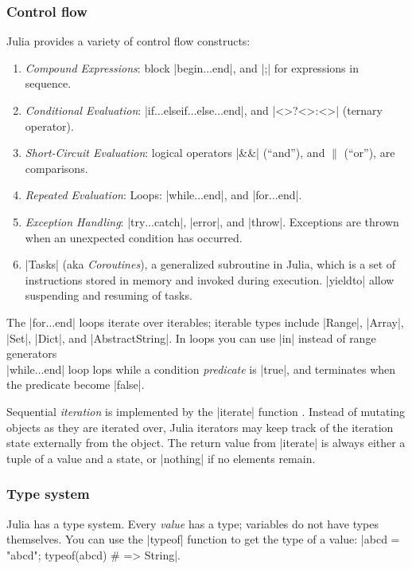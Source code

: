 \subsubsection*{Control flow}

Julia provides a variety of control flow constructs:
\begin{enumerate}
\item 
\emph{Compound Expressions}:  block |begin$\ldots$end|, and |;| for expressions in sequence.
\item 
\emph{Conditional Evaluation}: |if$\ldots$elseif$\ldots$else$\ldots$end|, and |<>?<>:<>| (ternary operator).
\item 
\emph{Short-Circuit Evaluation}: logical operators |&&| (“and”), and $\|$ (“or”), are  comparisons.
\item 
\emph{Repeated Evaluation}: Loops: |while$\ldots$end|, and |for$\ldots$end|.
\item 
\emph{Exception Handling}: |try$\ldots$catch|, |error|, and |throw|. Exceptions are thrown when an unexpected condition has occurred. 
\item 
|Tasks| (aka \emph{Coroutines}),  a generalized subroutine in Julia, which is a set of instructions stored in memory and invoked during execution.
|yieldto| allow suspending and resuming of tasks.

\end{enumerate}


The |for$\ldots$end| loops iterate over iterables; 
iterable types include |Range|, |Array|, |Set|, |Dict|, and |AbstractString|.
In loops you can use |in| instead of range generators\\
|while$\ldots$end| loop lops while a condition \emph{predicate} is |true|, and terminates when the predicate become |false|.

Sequential \emph{iteration} is implemented by the |iterate| function \cite{julia:iterate}. Instead of mutating objects as they are iterated over, Julia iterators may keep track of the iteration state externally from the object. The return value from |iterate| is always either a tuple of a value and a state, or |nothing| if no elements remain.


\subsubsection*{Type system}

Julia has a type system.
Every \emph{value} has a type; variables do not have types themselves.
You can use the |typeof| function to get the type of a value: |abcd = "abcd"; typeof(abcd) # => String|.

